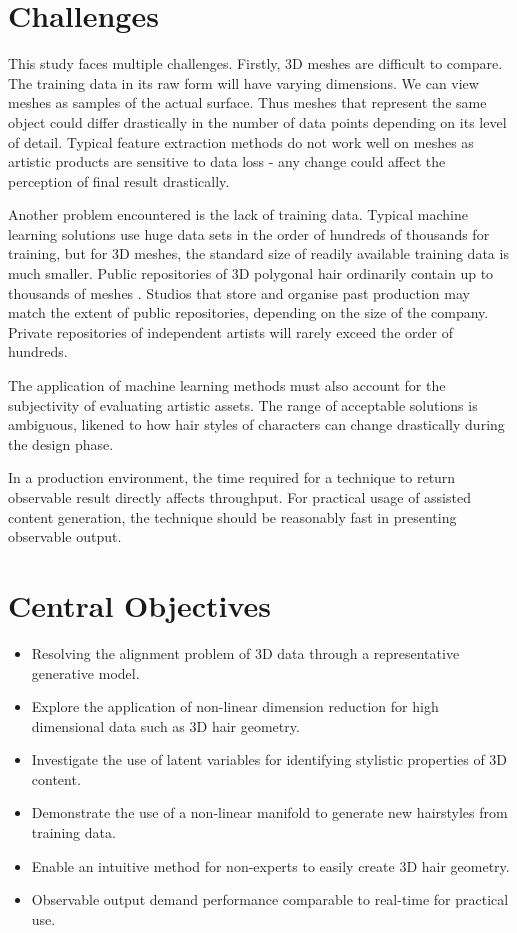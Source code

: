 \documentclass[ %
author={Dillon Keith Diep},
supervisor={Dr. Carl Henrik Ek},
degree={MEng},
title={ART-CG:},
subtitle={Assisted Real-time Content Generation of 3D Hair by Learning Manifolds},
type={Research},
year={2017} ]{dissertation}
\begin{document}
\section{Challenges}
This study faces multiple challenges. Firstly, 3D meshes are difficult to compare. The training data in its raw form will have varying dimensions. We can view meshes as samples of the actual surface. Thus meshes that represent the same object could differ drastically in the number of data points depending on its level of detail. Typical feature extraction methods do not work well on meshes as artistic products are sensitive to data loss - any change could affect the perception of final result drastically.

Another problem encountered is the lack of training data. Typical machine learning solutions use huge data sets in the order of hundreds of thousands for training, but for 3D meshes, the standard size of readily available training data is much smaller. Public repositories of 3D polygonal hair ordinarily contain up to thousands of meshes \cite{tsr}. Studios that store and organise past production may match the extent of public repositories, depending on the size of the company. Private repositories of independent artists will rarely exceed the order of hundreds.

The application of machine learning methods must also account for the subjectivity of evaluating artistic assets. The range of acceptable solutions is ambiguous, likened to how hair styles of characters can change drastically during the design phase.

In a production environment, the time required for a technique to return observable result directly affects throughput. For practical usage of assisted content generation, the technique should be reasonably fast in presenting observable output.

\section{Central Objectives}
\begin{itemize}
	\item Resolving the alignment problem of 3D data through a representative generative model.
	\item Explore the application of non-linear dimension reduction for high dimensional data such as 3D hair geometry.
	\item Investigate the use of latent variables for identifying stylistic properties of 3D content.
	\item Demonstrate the use of a non-linear manifold to generate new hairstyles from training data.
	\item Enable an intuitive method for non-experts to easily create 3D hair geometry.
	\item Observable output demand performance comparable to real-time for practical use.
\end{itemize}
\end{document}
